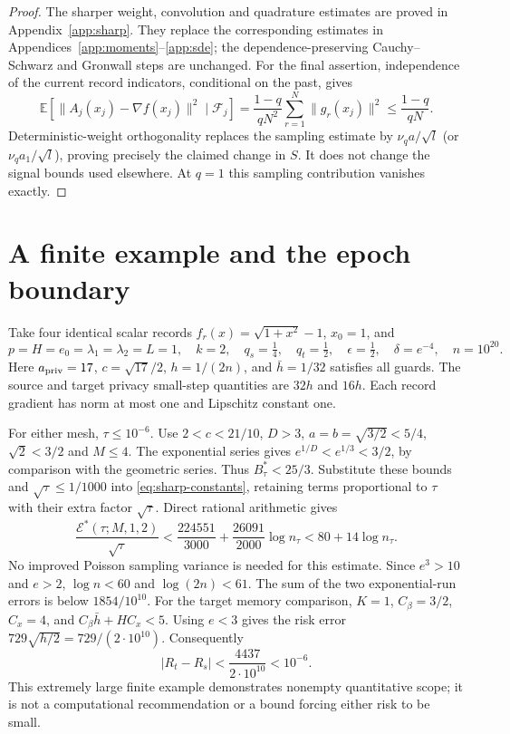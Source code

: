 \documentclass[a4paper,11pt]{article}
\theoremstyle{remark}
\newcommand{\E}{\mathbb E}
\newcommand{\norm}[1]{\lVert#1\rVert}
\begin{document}
\begin{proof}
The sharper weight, convolution and quadrature estimates are proved in
Appendix~\ref{app:sharp}. They replace the corresponding estimates in
Appendices~\ref{app:moments}--\ref{app:sde}; the dependence-preserving
Cauchy--Schwarz and Gronwall steps are unchanged. For the final assertion,
independence of the current record indicators, conditional on the past, gives
\[
 \E[\norm{A_j(x_j)-\nabla f(x_j)}^2\mid\mathcal F_j]
 =\frac{1-q}{qN^2}\sum_{r=1}^N\norm{g_r(x_j)}^2
 \le\frac{1-q}{qN}.
\]
Deterministic-weight orthogonality replaces the sampling estimate by
$\nu_q a/\sqrt l$ (or $\nu_q a_1/\sqrt l$), proving precisely the claimed
change in $S$. It does not change the signal bounds used elsewhere.
At $q=1$ this sampling contribution vanishes exactly.
\end{proof}

\section{A finite example and the epoch boundary}\label{sec:example}

Take four identical scalar records
$f_r(x)=\sqrt{1+x^2}-1$, $x_0=1$, and
\[
 p=H=e_0=\lambda_1=\lambda_2=L=1,\quad k=2,\quad
 q_s=\tfrac14,\quad q_t=\tfrac12,\quad
 \epsilon=\tfrac12,\quad\delta=e^{-4},\quad n=10^{20}.
\]
Here $a_{\rm priv}=17$, $c=\sqrt{17}/2$, $h=1/(2n)$, and
$\bar h=1/32$ satisfies all guards. The source and target privacy
small-step quantities are $32h$ and $16h$. Each record gradient has norm
at most one and Lipschitz constant one.

For either mesh, $\tau\le10^{-6}$. Use $2<c<21/10$, $D>3$,
$a=b=\sqrt{3/2}<5/4$, $\sqrt2<3/2$ and $M\le4$.
The exponential series gives $e^{1/D}<e^{1/3}<3/2$, by comparison
with the geometric series. Thus $B_\tau^*<25/3$.
Substitute these bounds and $\sqrt\tau\le1/1000$ into
\eqref{eq:sharp-constants}, retaining terms proportional to
$\tau$ with their extra factor $\sqrt\tau$. Direct rational arithmetic gives
\[
 \frac{\mathcal E^*(\tau;M,1,2)}{\sqrt\tau}
 <\frac{224551}{3000}+\frac{26091}{2000}\log n_\tau
 <80+14\log n_\tau.
\]
No improved Poisson sampling variance is needed for this estimate.
Since $e^3>10$ and $e>2$, $\log n<60$ and $\log(2n)<61$.
The sum of the two exponential-run errors is below $1854/10^{10}$.
For the target memory comparison, $K=1$, $C_\beta=3/2$, $C_x=4$,
and $C_\beta\bar h+HC_x<5$. Using $e<3$ gives the risk error
$729\sqrt{h/2}=729/(2\cdot10^{10})$. Consequently
\begin{equation}\label{eq:finite-example}
 |R_t-R_s|<\frac{4437}{2\cdot10^{10}}<10^{-6}.
\end{equation}
This extremely large finite example demonstrates nonempty quantitative
scope; it is not a computational recommendation or a bound forcing either
risk to be small.
\end{document}
